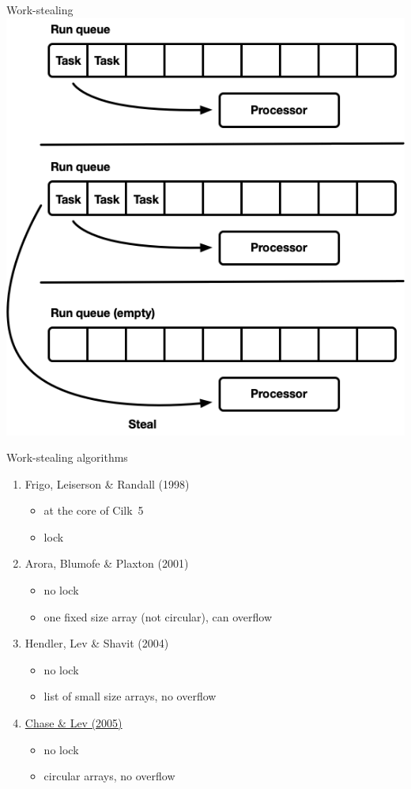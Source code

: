 \begin{frame}{Work-stealing}
\centering
\includegraphics[scale=0.37]{images/work_stealing.png}
\end{frame}


\begin{frame}{Work-stealing algorithms}
\begin{enumerate}
	\item Frigo, Leiserson \& Randall (1998)
		\begin{itemize}
			\item at the core of Cilk~5
			\item lock
		\end{itemize}
	\item Arora, Blumofe \& Plaxton (2001)
		\begin{itemize}
			\item no lock
			\item one fixed size array (not circular), can overflow
		\end{itemize}
	\item Hendler, Lev \& Shavit (2004)
		\begin{itemize}
			\item no lock
			\item list of small size arrays, no overflow
		\end{itemize}
	\item \underline{Chase \& Lev (2005)}
		\begin{itemize}
			\item no lock
			\item circular arrays, no overflow
		\end{itemize}
\end{enumerate}
\end{frame}
